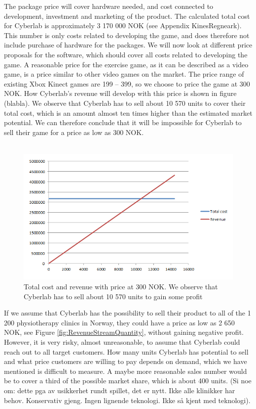 The package price will cover hardware needed, and cost connected to development, investment and marketing of the product. The calculated total cost for Cyberlab is approximately 3 170 000 NOK (see Appendix KinesRegneark). This number is only costs related to developing the game, and does therefore not include purchase of hardware for the packages. We will now look at different price proposals for the software, which should cover all costs related to developing the game. A reasonable price for the exercise game, as it can be described as a video game, is a price similar to other video games on the market. The price range of existing Xbox Kinect games are 199 – 399, so we choose to price the game at 300 NOK. How Cyberlab’s revenue will develop with this price is shown in figure (blabla). We observe that Cyberlab has to sell about 10 570 units to cover their total cost, which is an amount almost ten times higher than the estimated market potential. We can therefore conclude that it will be impossible for Cyberlab to sell their game for a price as low as 300 NOK. \\ \\
\begin{figure}
\label{fig:FixedLowPrice}
\begin{center}
\includegraphics[scale=0.7]{fixedlowprice}
\caption[Price related to commercial video games]{Total cost and revenue with price at 300 NOK. We observe that Cyberlab has to sell about 10 570 units to gain some profit}
\end{center}
\end{figure}
If we assume that Cyberlab has the possibility to sell their product to all of the 1 200 physiotherapy clinics in Norway, they could have a price as low as 2 650 NOK, see Figure \ref{fig:RevenueStreamQuantity}, without gaining negative profit. However, it is very risky, almost unreasonable, to assume that Cyberlab could reach out to all target customers. How many units Cyberlab has potential to sell and what price customers are willing to pay depends on demand, which we have mentioned is difficult to measure. A maybe more reasonable sales number would be to cover a third of the possible market share, which is about 400 units. (Si noe om: dette pga av usikkerhet rundt spillet, det er nytt. Ikke alle klinikker har behov. Konservativ gjeng. Ingen lignende teknologi. Ikke s{å} kjent med teknologi).\\ \\
